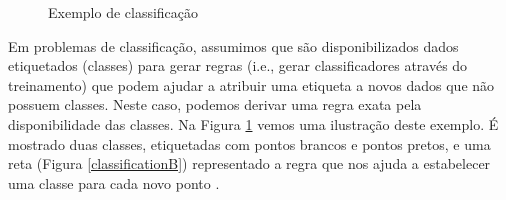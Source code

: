 \begin{figure}[!htb]
  \centering
  \caption{\label{classification} Exemplo de classificação}
  \qquad
  \vspace{1.5em}
  \Ididthis
\end{figure}

Em problemas de classificação, assumimos que são disponibilizados dados
etiquetados (classes) para gerar regras (i.e., gerar classificadores através do
treinamento) que podem ajudar a atribuir uma etiqueta a novos dados que não
possuem classes. Neste caso, podemos derivar uma regra exata pela
disponibilidade das classes. Na Figura \ref{classification} vemos uma ilustração
deste exemplo. É mostrado duas classes, etiquetadas com pontos brancos e pontos
pretos, e uma reta (Figura \ref{classificationB}) representado a regra que nos
ajuda a estabelecer uma classe para cada novo ponto
\cite{suthaharan2016machine}.

